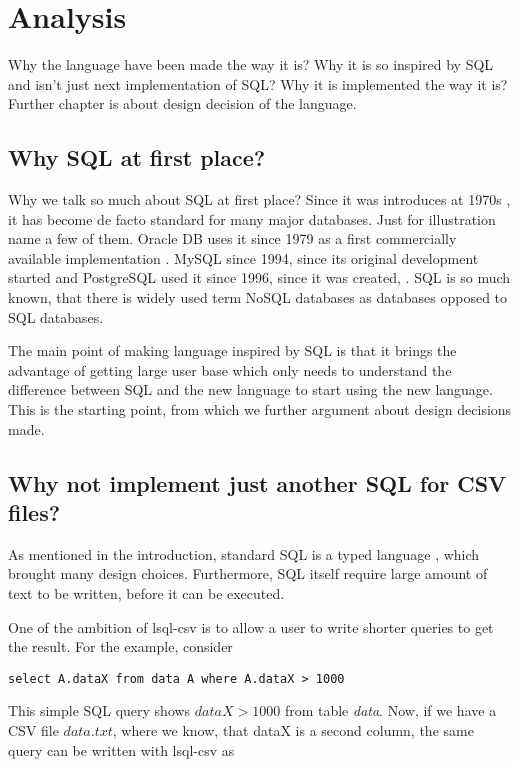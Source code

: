 \chapter{Analysis}
Why the language have been made the way it is? Why it is so inspired by SQL and isn't just next implementation of SQL?
Why it is implemented the way it is?
Further chapter is about design decision of the language.


\section{Why SQL at first place?}
Why we talk so much about SQL at first place? Since it was introduces at 1970s \cite{enwiki-sql}, it has
become de facto standard for many major databases. Just for illustration name a few of them.
Oracle DB uses it since 1979 as a first commercially available implementation
\cite{oracle-db-sql}. MySQL since 1994, since its original development started \cite{enwiki-mysql} and PostgreSQL used it since 1996, since it was created, \cite{postgres-birthday}. SQL is so much known, that there is widely used term NoSQL databases as databases opposed to SQL databases.

The main point of making language inspired by SQL is that it brings the advantage of getting large user base which only needs to understand the difference between SQL and the new language to start using the new language. This is the starting point, from which we further argument about design decisions made.


\section{Why not implement just another SQL for CSV files?}
As mentioned in the introduction, standard SQL is a typed language \cite{ISO9075-1987}, 
which brought many design choices. Furthermore, SQL itself require large amount of text to be written,
before it can be executed. 

One of the ambition of lsql-csv is to allow a user to write shorter queries to get the result. For the example,
consider

\begin{verbatim}
select A.dataX from data A where A.dataX > 1000
\end{verbatim}

This simple SQL query shows $dataX > 1000$ from table \textit{data}. 
Now, if we have a CSV file $data.txt$, where we know, that dataX is a second column, the same query can 
be written with lsql-csv as

